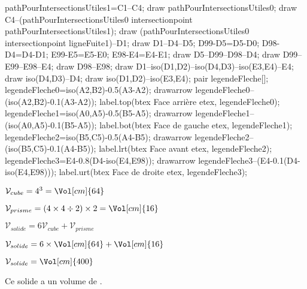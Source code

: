 \begin{corrige}
\begin{Geometrie}
        pathPourIntersectionsUtiles1=C1--C4;
        draw pathPourIntersectionsUtiles0;
        draw C4--(pathPourIntersectionsUtiles0 intersectionpoint pathPourIntersectionsUtiles1);
        draw (pathPourIntersectionsUtiles0 intersectionpoint ligneFuite1)--D1;
        draw D1--D4--D5;
        D99-D5=D5-D0;
        D98-D4=D4-D1;
        E99-E5=E5-E0;
        E98-E4=E4-E1;
        draw D5--D99--D98--D4;
        draw D99--E99--E98--E4;
        draw D98--E98;
        draw D1--iso(D1,D2)--iso(D4,D3)--iso(E3,E4)--E4;
        draw iso(D4,D3)--D4;
        draw iso(D1,D2)--iso(E3,E4);
        pair legendeFleche[];
        legendeFleche0=iso(A2,B2)-0.5(A3-A2);
        drawarrow legendeFleche0--(iso(A2,B2)-0.1(A3-A2));
        label.top(btex Face arrière etex, legendeFleche0);
        legendeFleche1=iso(A0,A5)-0.5(B5-A5);
        drawarrow legendeFleche1--(iso(A0,A5)-0.1(B5-A5));
        label.bot(btex Face de gauche etex, legendeFleche1);
        legendeFleche2=iso(B5,C5)-0.5(A4-B5);
        drawarrow legendeFleche2--(iso(B5,C5)-0.1(A4-B5));
        label.lrt(btex Face avant etex, legendeFleche2);
        legendeFleche3=E4-0.8(D4-iso(E4,E98));
        drawarrow legendeFleche3--(E4-0.1(D4-iso(E4,E98)));
        label.urt(btex Face de droite etex, legendeFleche3);
    \end{Geometrie}

    {\color{red}%
    $\mathcal{V}_{cube}=4^3=\Vol[cm]{64}$

    $\mathcal{V}_{prisme}=(4\times 4 \div 2)\times 2=\Vol[cm]{16}$

    $\mathcal{V}_{solide}=6\mathcal{V}_{cube}+\mathcal{V}_{prisme}$

    $\mathcal{V}_{solide}=6\times\Vol[cm]{64}+\Vol[cm]{16}$

    $\mathcal{V}_{solide}=\Vol[cm]{400}$

    Ce solide a un volume de .
    }
\end{corrige}
